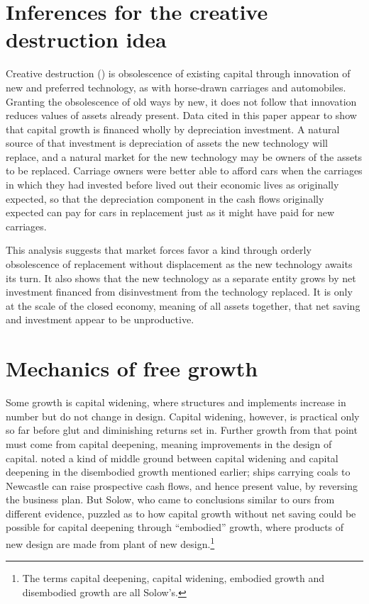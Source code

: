 \documentclass[a4paper,fleqn]{latex_styles/cas-sc}
\begin{document}
\section{Inferences for the creative destruction idea}\label{inferences-for-the-creative-destruction-idea}

Creative destruction (\cite{schumpeter1911}) is
obsolescence of existing capital through innovation of new and preferred
technology, as with horse-drawn carriages and automobiles. Granting the
obsolescence of old ways by new, it does not follow that innovation reduces
values of assets already present. Data cited in this paper appear to show that
capital growth is financed wholly by depreciation investment. A natural source
of that investment is depreciation of assets the new technology will replace,
and a natural market for the new technology may be owners of the assets to be
replaced. Carriage owners were better able to afford cars when the carriages in
which they had invested  before lived out their economic lives as originally
expected, so that the depreciation component in the cash flows originally
expected can pay for cars in replacement just as it might have paid for new
carriages. 

This analysis suggests that market forces favor a kind through orderly obsolescence
of replacement without displacement as the new technology awaits its turn. It
also shows that the new technology as a separate entity grows by net investment
financed from disinvestment from the technology replaced. It is only at the
scale of the closed economy, meaning of all assets together, that net saving
and investment appear to be unproductive.


\hypertarget{mechanics-of-free-growth}{%
\section{Mechanics of free growth}\label{mechanics-of-free-growth}}

Some growth is capital widening, where structures and implements
increase in number but do not change in design. Capital widening,
however, is practical only so far before glut and diminishing returns
set in. Further growth from that point must come from capital deepening,
meaning improvements in the design of capital.
\citet{solowContributionTheoryEconomic1956a} noted a kind of middle
ground between capital widening and capital deepening in the disembodied
growth mentioned earlier; ships carrying coals to Newcastle can raise
prospective cash flows, and hence present value, by reversing the
business plan. But Solow, who came to conclusions similar to ours from
different evidence, puzzled as to how capital growth without net
saving could be possible for capital deepening through ``embodied''
growth, where products of new design are made from plant of new
design.\footnote{The terms capital deepening, capital widening, embodied
  growth and disembodied growth are all Solow's.}
\end{document}
